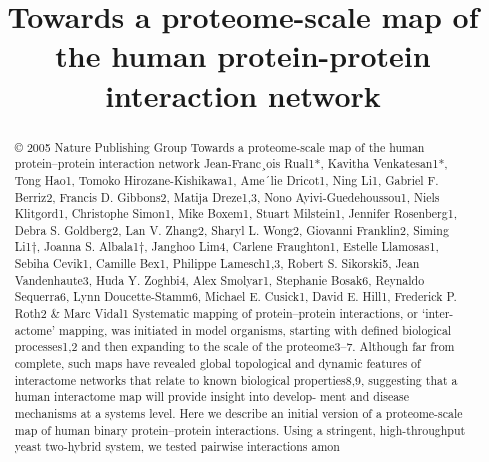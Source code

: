 \title{Towards a proteome-scale map of the human protein-protein interaction network}

\maketitle

\begin{abstract}
© 2005 Nature Publishing Group Towards a proteome-scale map of the human protein–protein interaction network Jean-Franc¸ois Rual1*, Kavitha Venkatesan1*, Tong Hao1, Tomoko Hirozane-Kishikawa1, Ame´lie Dricot1, Ning Li1, Gabriel F. Berriz2, Francis D. Gibbons2, Matija Dreze1,3, Nono Ayivi-Guedehoussou1, Niels Klitgord1, Christophe Simon1, Mike Boxem1, Stuart Milstein1, Jennifer Rosenberg1, Debra S. Goldberg2, Lan V. Zhang2, Sharyl L. Wong2, Giovanni Franklin2, Siming Li1†, Joanna S. Albala1†, Janghoo Lim4, Carlene Fraughton1, Estelle Llamosas1, Sebiha Cevik1, Camille Bex1, Philippe Lamesch1,3, Robert S. Sikorski5, Jean Vandenhaute3, Huda Y. Zoghbi4, Alex Smolyar1, Stephanie Bosak6, Reynaldo Sequerra6, Lynn Doucette-Stamm6, Michael E. Cusick1, David E. Hill1, Frederick P. Roth2 \& Marc Vidal1 Systematic mapping of protein–protein interactions, or ‘inter- actome’ mapping, was initiated in model organisms, starting with deﬁned biological processes1,2 and then expanding to the scale of the proteome3–7. Although far from complete, such maps have revealed global topological and dynamic features of interactome networks that relate to known biological properties8,9, suggesting that a human interactome map will provide insight into develop- ment and disease mechanisms at a systems level. Here we describe an initial version of a proteome-scale map of human binary protein–protein interactions. Using a stringent, high-throughput yeast two-hybrid system, we tested pairwise interactions amon
\end{abstract}

